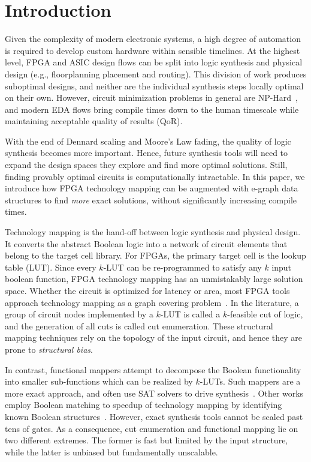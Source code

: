 \section{Introduction}\label{sec:intro}
Given the complexity of modern electronic systems, a high degree of automation
is required to develop custom hardware within sensible timelines. At the
highest level, FPGA and ASIC design flows can be split into logic synthesis and
physical design (e.g., floorplanning placement and routing). This division of
work produces suboptimal designs, and neither are the individual synthesis
steps locally optimal on their own. However, circuit minimization problems in
general are NP-Hard~\cite{logicmin,twolevellogic}, and modern EDA flows bring
compile times down to the human timescale while maintaining acceptable quality
of results (QoR).

With the end of Dennard scaling and Moore's Law fading, the quality of logic
synthesis becomes more important. Hence, future synthesis tools will need to
expand the design spaces they explore and find more optimal solutions. Still,
finding provably optimal circuits is computationally intractable. In this
paper, we introduce how FPGA technology mapping can be augmented with e-graph
data structures to find \textit{more} exact solutions, without significantly
increasing compile times.

Technology mapping is the hand-off between logic synthesis and physical design.
It converts the abstract Boolean logic into a network of circuit elements that
belong to the target cell library. For FPGAs, the primary target cell is the
lookup table (LUT). Since every $k$-LUT can be re-programmed to satisfy any $k$
input boolean function, FPGA technology mapping has an unmistakably large
solution space. Whether the circuit is optimized for latency or area, most FPGA
tools approach technology mapping as a graph covering problem~\cite{flowmap,
    daomap, attmap, imap}. In the literature, a group of circuit nodes implemented
by a $k$-LUT is called a $k$-feasible cut of logic, and the generation of all
cuts is called cut enumeration. These structural mapping techniques rely on the
topology of the input circuit, and hence they are prone to \textit{structural
    bias}.

In contrast, functional mappers attempt to decompose the Boolean functionality
into smaller sub-functions which can be realized by $k$-LUTs. Such mappers are
a more exact approach, and often use SAT solvers to drive
synthesis~\cite{satmap,satmap2}. Other works employ Boolean matching to speedup
of technology mapping by identifying known Boolean
structures~\cite{boolmatch,fastboolmatch}. However, exact synthesis tools
cannot be scaled past tens of gates. As a consequence, cut enumeration and
functional mapping lie on two different extremes. The former is fast but
limited by the input structure, while the latter is unbiased but fundamentally
unscalable.

